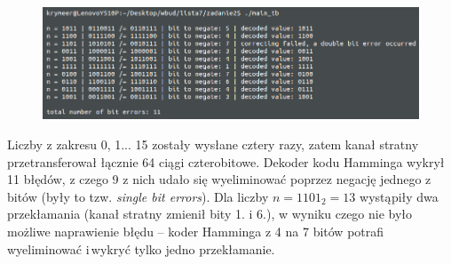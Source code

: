 \documentclass[a4paper,11pt]{article}
\begin{document}
    \begin{figure}[H]\centering
      \includegraphics[width=1.2\textwidth,center]{output.png}
    \end{figure}

  Liczby z zakresu 0, 1... 15 zostały wysłane cztery razy, zatem kanał stratny przetransferował łącznie 64 ciągi czterobitowe. Dekoder kodu Hamminga wykrył 11 błędów, z czego 9 z nich udało się wyeliminować poprzez negację jednego z bitów (były to tzw. \textit{single bit errors}). Dla liczby $n=1101_2=13$ wystąpiły dwa przekłamania (kanał stratny zmienił bity 1. i 6.), w wyniku czego nie było możliwe naprawienie błędu -- koder Hamminga z 4 na 7 bitów potrafi wyeliminować i\,wykryć tylko jedno przekłamanie.
\end{document}
